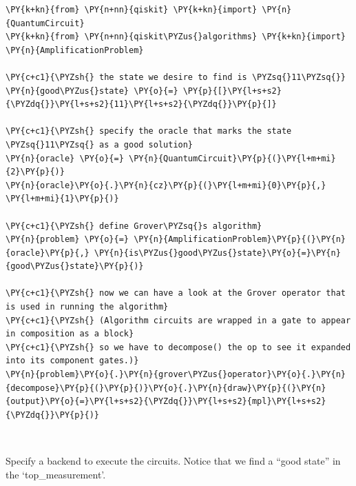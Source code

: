     \begin{tcolorbox}[breakable, size=fbox, boxrule=1pt, pad at break*=1mm,colback=cellbackground, colframe=cellborder]
\begin{Verbatim}[commandchars=\\\{\}]
\PY{k+kn}{from} \PY{n+nn}{qiskit} \PY{k+kn}{import} \PY{n}{QuantumCircuit}
\PY{k+kn}{from} \PY{n+nn}{qiskit\PYZus{}algorithms} \PY{k+kn}{import} \PY{n}{AmplificationProblem}

\PY{c+c1}{\PYZsh{} the state we desire to find is \PYZsq{}11\PYZsq{}}
\PY{n}{good\PYZus{}state} \PY{o}{=} \PY{p}{[}\PY{l+s+s2}{\PYZdq{}}\PY{l+s+s2}{11}\PY{l+s+s2}{\PYZdq{}}\PY{p}{]}

\PY{c+c1}{\PYZsh{} specify the oracle that marks the state \PYZsq{}11\PYZsq{} as a good solution}
\PY{n}{oracle} \PY{o}{=} \PY{n}{QuantumCircuit}\PY{p}{(}\PY{l+m+mi}{2}\PY{p}{)}
\PY{n}{oracle}\PY{o}{.}\PY{n}{cz}\PY{p}{(}\PY{l+m+mi}{0}\PY{p}{,} \PY{l+m+mi}{1}\PY{p}{)}

\PY{c+c1}{\PYZsh{} define Grover\PYZsq{}s algorithm}
\PY{n}{problem} \PY{o}{=} \PY{n}{AmplificationProblem}\PY{p}{(}\PY{n}{oracle}\PY{p}{,} \PY{n}{is\PYZus{}good\PYZus{}state}\PY{o}{=}\PY{n}{good\PYZus{}state}\PY{p}{)}

\PY{c+c1}{\PYZsh{} now we can have a look at the Grover operator that is used in running the algorithm}
\PY{c+c1}{\PYZsh{} (Algorithm circuits are wrapped in a gate to appear in composition as a block}
\PY{c+c1}{\PYZsh{} so we have to decompose() the op to see it expanded into its component gates.)}
\PY{n}{problem}\PY{o}{.}\PY{n}{grover\PYZus{}operator}\PY{o}{.}\PY{n}{decompose}\PY{p}{(}\PY{p}{)}\PY{o}{.}\PY{n}{draw}\PY{p}{(}\PY{n}{output}\PY{o}{=}\PY{l+s+s2}{\PYZdq{}}\PY{l+s+s2}{mpl}\PY{l+s+s2}{\PYZdq{}}\PY{p}{)}
\end{Verbatim}
\end{tcolorbox}
 
            
    
    \begin{center}
    \end{center}
    { \hspace*{\fill} \\}
    

    Specify a backend to execute the circuits. Notice that we find a ``good
state'' in the `top\_measurement'.

